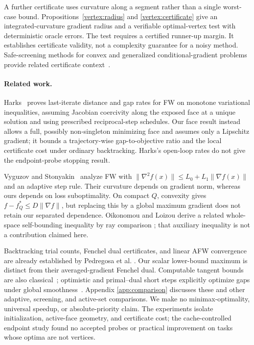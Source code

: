 A further certificate uses curvature along a segment rather than a
single worst-case bound. Propositions~\ref{vertex:radius} and
\ref{vertex:certificate} give an integrated-curvature gradient radius
and a verifiable optimal-vertex test with deterministic oracle errors.
The test requires a certified runner-up margin. It establishes
certificate validity, not a complexity guarantee for a noisy method.
Safe-screening methods for convex and generalized conditional-gradient
problems provide related certificate context~\cite{raj,sunbach}.

\paragraph{Related work.}
Harks~\cite[Theorem 1 and Corollary 3]{harks} proves last-iterate
distance and gap rates for FW on monotone variational inequalities,
assuming Jacobian coercivity along the exposed face at a unique solution
and using prescribed reciprocal-step schedules. Our face result instead
allows a full, possibly non-singleton minimizing face and assumes only a
Lipschitz gradient; it bounds a trajectory-wise gap-to-objective ratio
and the local certificate cost under ordinary backtracking. Harks's
open-loop rates do not give the endpoint-probe stopping result.

Vyguzov and Stonyakin~\cite{vyguzov} analyze FW with
$\|\nabla^2 f(x)\|\le L_0+L_1\|\nabla f(x)\|$ and an adaptive step
rule. Their curvature depends on gradient norm, whereas ours depends on
loss suboptimality. On compact $Q$, convexity gives
$f-f_Q^*\le D\|\nabla f\|$, but replacing this by a global maximum
gradient does not retain our separated dependence. Oikonomou and Loizou
derive a related whole-space self-bounding inequality by ray comparison
\cite[Lemma B.7, Eq.~(30)]{oikonomouloizou}; that auxiliary inequality
is not a contribution claimed here.

Backtracking trial counts, Fenchel dual certificates, and linear AFW
convergence are already established by Pedregosa et al.
\cite[Theorems 1, 3, and 4]{pedregosa}. Our scalar lower-bound maximum
is distinct from their averaged-gradient Fenchel dual. Computable
tangent bounds are also classical~\cite[Method 1]{freundgrigas};
optimistic and primal--dual short steps explicitly optimize gaps under
global smoothness~\cite[Proposition 4.1]{beyondshort}. Appendix
\ref{app:comparison} discusses these and other adaptive, screening, and
active-set comparisons. We make no minimax-optimality, universal
speedup, or absolute-priority claim. The experiments isolate
initialization, active-face geometry, and certificate cost; the
cache-controlled endpoint study found no accepted probes or practical
improvement on tasks whose optima are not vertices.
